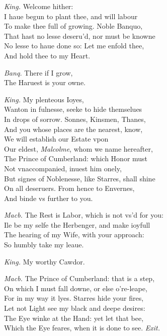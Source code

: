 \documentclass[12pt]{sides}
\newcommand{\dia}[1]{\hskip 15pt\textit{#1}\hskip 6pt}
\begin{document}
\begin{multicols}{2}
            \dia{King.} Welcome hither: \\ I haue begun to plant thee, and will labour \\ To make thee full of growing. Noble Banquo, \\ That hast no lesse deseru'd, nor must be knowne \\ No lesse to haue done so: Let me enfold thee, \\ And hold thee to my Heart.
            
            \dia{Banq.} There if I grow, \\ The Haruest is your owne.

            \dia{King.} My plenteous Ioyes, \\ Wanton in fulnesse, seeke to hide themselues \\ In drops of sorrow. Sonnes, Kinsmen, Thanes, \\ And you whose places are the nearest, know, \\ We will establish our Estate vpon \\ Our eldest, \textit{Malcolme}, whom we name hereafter, \\ The Prince of Cumberland: which Honor must \\ Not vnaccompanied, inuest him onely, \\ But signes of Noblenesse, like Starres, shall shine \\ On all deseruers. From hence to Envernes, \\ And binde vs further to you.

            \dia{Macb.} The Rest is Labor, which is not vs'd for you: \\ Ile be my selfe the Herbenger, and make ioyfull \\ The hearing of my Wife, with your approach: \\ So humbly take my leaue.
            
            \dia{King.} My worthy Cawdor.

            \dia{Macb.} The Prince of Cumberland: that is a step, \\ On which I must fall downe, or else o're-leape, \\ For in my way it lyes. Starres hide your fires, \\ Let not Light see my black and deepe desires: \\ The Eye winke at the Hand: yet let that bee, \\ Which the Eye feares, when it is done to see. \hfill \textit{Exit.}


\end{multicols}
\end{document}
